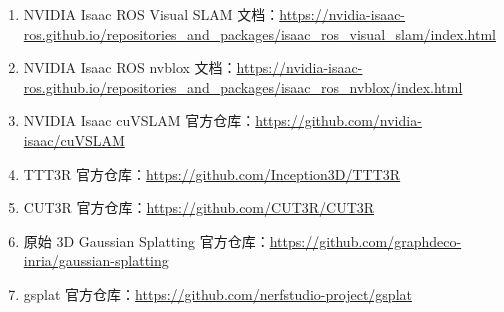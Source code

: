 \documentclass[12pt]{article}
\begin{document}
\begin{enumerate}
  \item NVIDIA Isaac ROS Visual SLAM 文档：\url{https://nvidia-isaac-ros.github.io/repositories_and_packages/isaac_ros_visual_slam/index.html}
  \item NVIDIA Isaac ROS nvblox 文档：\url{https://nvidia-isaac-ros.github.io/repositories_and_packages/isaac_ros_nvblox/index.html}
  \item NVIDIA Isaac cuVSLAM 官方仓库：\url{https://github.com/nvidia-isaac/cuVSLAM}
  \item TTT3R 官方仓库：\url{https://github.com/Inception3D/TTT3R}
  \item CUT3R 官方仓库：\url{https://github.com/CUT3R/CUT3R}
  \item 原始 3D Gaussian Splatting 官方仓库：\url{https://github.com/graphdeco-inria/gaussian-splatting}
  \item gsplat 官方仓库：\url{https://github.com/nerfstudio-project/gsplat}
\end{enumerate}
\end{document}
